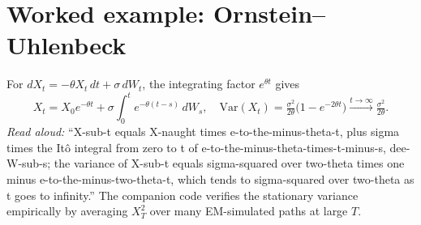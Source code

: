 \documentclass[11pt]{article}
\begin{document}
\section{Worked example: Ornstein--Uhlenbeck}

For $dX_t = -\theta X_t\,dt + \sigma\,dW_t$, the integrating factor $e^{\theta t}$ gives
\[
X_t = X_0 e^{-\theta t} + \sigma\!\int_0^t e^{-\theta(t-s)}\,dW_s,
\quad
\mathrm{Var}(X_t) = \tfrac{\sigma^2}{2\theta}\bigl(1 - e^{-2\theta t}\bigr) \xrightarrow{t\to\infty}
\tfrac{\sigma^2}{2\theta}.
\]
\emph{Read aloud:} ``X-sub-t equals X-naught times e-to-the-minus-theta-t, plus sigma times the It\^o integral from zero to t of e-to-the-minus-theta-times-t-minus-s, dee-W-sub-s; the variance of X-sub-t equals sigma-squared over two-theta times one minus e-to-the-minus-two-theta-t, which tends to sigma-squared over two-theta as t goes to infinity.''
The companion code verifies the stationary variance empirically by averaging
$X_T^2$ over many EM-simulated paths at large $T$.
\end{document}
